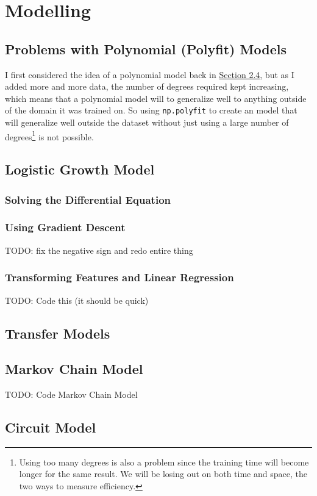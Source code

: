 \documentclass{report}
\begin{document}
    \section{Modelling}
        \subsection{Problems with Polynomial (Polyfit) Models}
        \label{sec:problems}
            I first considered the idea of a polynomial model back in \hyperref[sec:polys]{Section 2.4}, but as I added more and more data, the number of degrees required kept increasing, which means that a polynomial model will to generalize well to anything outside of the domain it was trained on.
            \newline\indent
            So using \lstinline{np.polyfit} to create an model that will generalize well outside the dataset without just using a large number of degrees\footnote{Using too many degrees is also a problem since the training time will become longer for the same result. We will be losing out on both time and space, the two ways to measure efficiency.} is not possible.
        \subsection{Logistic Growth Model}
            \subsubsection{Solving the Differential Equation}
            \subsubsection{Using Gradient Descent}
            TODO: fix the negative sign and redo entire thing
            \subsubsection{Transforming Features and Linear Regression}
            TODO: Code this (it should be quick)
        \subsection{Transfer Models}
        \subsection{Markov Chain Model}
            TODO: Code Markov Chain Model
        \subsection{Circuit Model}
\end{document}
